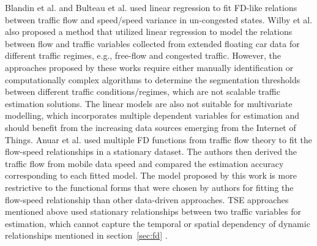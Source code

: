\documentclass[english]{kththesis}
\begin{document}
Blandin et al. \cite{blandin_individual_speed} and Bulteau et al. \cite{Bulteau_flow_higher-order} used linear regression to fit FD-like relations between traffic flow and speed/speed variance in un-congested states. Wilby et al. \cite{wilby_flow_estimation_xfcd} also proposed a method that utilized linear regression to model the relations between flow and traffic variables collected from extended floating car data for different traffic regimes, e.g., free-flow and congested traffic. However, the approaches proposed by these works require either manually identification or computationally complex algorithms to determine the segmentation thresholds between different traffic conditions/regimes, which are not scalable traffic estimation solutions. The linear models are also not suitable for multivariate modelling, which incorporates multiple dependent variables for estimation and should benefit from the increasing data sources emerging from the Internet of Things. Anuar et al. \cite{anuar_flow_probe} used multiple FD functions from traffic flow theory to fit the flow-speed relationships in a stationary dataset. The authors then derived the traffic flow from mobile data speed and compared the estimation accuracy corresponding to each fitted model. The model proposed by this work is more restrictive to the functional forms that were chosen by authors for fitting the flow-speed relationship than other data-driven approaches. TSE approaches mentioned above used stationary relationships between two traffic variables for estimation, which cannot capture the temporal or spatial dependency of dynamic relationships mentioned in section~\ref{sec:fd} .
\end{document}
